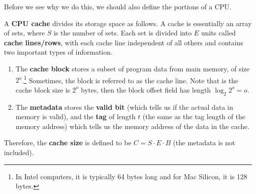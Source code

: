  Before we see why we do this, we should also define the portions of a CPU. 

  \begin{definition}
    A \textbf{CPU cache} divides its storage space as follows. A cache is essentially an array of sets, where $S$ is the number of sets. Each set is divided into $E$ units called \textbf{cache lines/rows}, with each cache line independent of all others and contains two important types of information. 
    \begin{enumerate}
      \item The \textbf{cache block} stores a subset of program data from main memory, of size $2^o$.\footnote{In Intel computers, it is typically 64 bytes long and for Mac Silicon, it is 128 bytes.} Sometimes, the block is referred to as the cache line. Note that is the cache block size is $2^o$ bytes, then the block offset field has length $\log_2 2^o = o$.
      \item The \textbf{metadata} stores the \textbf{valid bit} (which tells us if the actual data in memory is valid), and the \textbf{tag} of length $t$ (the same as the tag length of the memory address) which tells us the memory address of the data in the cache. 
    \end{enumerate}
    Therefore, the \textbf{cache size} is defined to be $C = S \cdot E \cdot B$ (the metadata is not included). 
    \begin{figure}[H]
      \centering 
\end{figure}
\end{definition}
